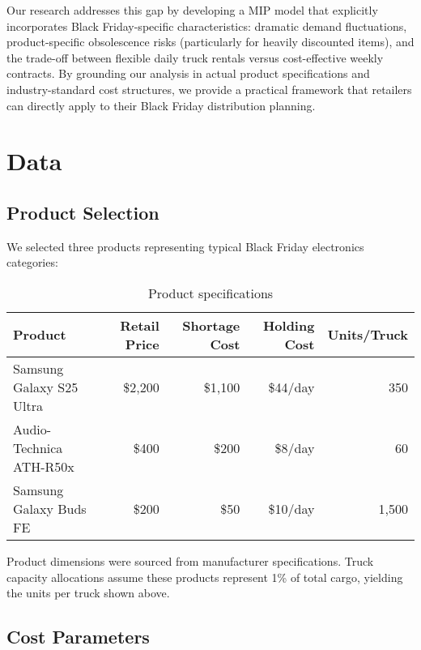 \documentclass[a4paper,12pt]{article}
\begin{document}
Our research addresses this gap by developing a MIP model that explicitly incorporates Black Friday-specific characteristics: dramatic demand fluctuations, product-specific obsolescence risks (particularly for heavily discounted items), and the trade-off between flexible daily truck rentals versus cost-effective weekly contracts.
By grounding our analysis in actual product specifications and industry-standard cost structures, we provide a practical framework that retailers can directly apply to their Black Friday distribution planning.




\section{Data}\label{sec:data}

\subsection{Product Selection}\label{subsec:product-selection}
We selected three products representing typical Black Friday electronics categories:

\begin{table}[h]
\centering
\caption{Product specifications}
\begin{tabular}{lrrrr}
\toprule
Product & Retail Price & Shortage Cost & Holding Cost & Units/Truck \\
\midrule
Samsung Galaxy S25 Ultra & \$2,200 & \$1,100 & \$44/day & 350 \\
Audio-Technica ATH-R50x & \$400 & \$200 & \$8/day & 60 \\
Samsung Galaxy Buds FE & \$200 & \$50 & \$10/day & 1,500 \\
\bottomrule
\end{tabular}\label{tab:table}
\end{table}

Product dimensions were sourced from manufacturer specifications.
Truck capacity allocations assume these products represent 1\% of total cargo, yielding the units per truck shown above.

\subsection{Cost Parameters}\label{subsec:cost-parameters}
\end{document}
